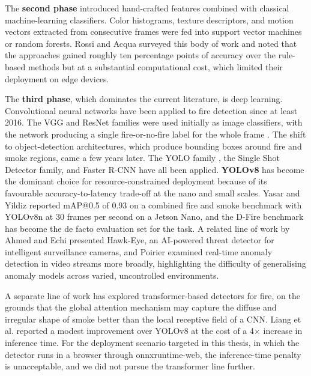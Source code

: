 The \textbf{second phase} introduced hand-crafted features combined with classical machine-learning classifiers. Color histograms, texture descriptors, and motion vectors extracted from consecutive frames were fed into support vector machines or random forests. Rossi and Acqua \cite{rossi2015feature} surveyed this body of work and noted that the approaches gained roughly ten percentage points of accuracy over the rule-based methods but at a substantial computational cost, which limited their deployment on edge devices.

The \textbf{third phase}, which dominates the current literature, is deep learning. Convolutional neural networks have been applied to fire detection since at least 2016. The VGG and ResNet families were used initially as image classifiers, with the network producing a single fire-or-no-fire label for the whole frame \cite{simonyan2014vgg}. The shift to object-detection architectures, which produce bounding boxes around fire and smoke regions, came a few years later. The YOLO family \cite{ultralytics2023yolov8}, the Single Shot Detector family, and Faster R-CNN have all been applied. \textbf{YOLOv8} has become the dominant choice for resource-constrained deployment because of its favourable accuracy-to-latency trade-off at the nano and small scales. Yasar and Yildiz \cite{yasar2024fireyolo} reported mAP@0.5 of 0.93 on a combined fire and smoke benchmark with YOLOv8n at 30 frames per second on a Jetson Nano, and the D-Fire benchmark \cite{dunnhofer2023dfire} has become the de facto evaluation set for the task. A related line of work by Ahmed and Echi \cite{Ahmed2021} presented Hawk-Eye, an AI-powered threat detector for intelligent surveillance cameras, and Poirier \cite{poirier2024anomaly} examined real-time anomaly detection in video streams more broadly, highlighting the difficulty of generalising anomaly models across varied, uncontrolled environments.

A separate line of work has explored transformer-based detectors for fire, on the grounds that the global attention mechanism may capture the diffuse and irregular shape of smoke better than the local receptive field of a CNN. Liang et al. \cite{liang2024firetransformer} reported a modest improvement over YOLOv8 at the cost of a 4$\times$ increase in inference time. For the deployment scenario targeted in this thesis, in which the detector runs in a browser through onnxruntime-web, the inference-time penalty is unacceptable, and we did not pursue the transformer line further.


